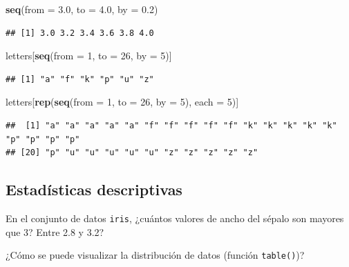 \documentclass[
]{book}
\newenvironment{Shaded}{\begin{snugshade}}{\end{snugshade}}
\newcommand{\DataTypeTok}[1]{\textcolor[rgb]{0.13,0.29,0.53}{#1}}
\newcommand{\DecValTok}[1]{\textcolor[rgb]{0.00,0.00,0.81}{#1}}
\newcommand{\FloatTok}[1]{\textcolor[rgb]{0.00,0.00,0.81}{#1}}
\newcommand{\KeywordTok}[1]{\textcolor[rgb]{0.13,0.29,0.53}{\textbf{#1}}}
\newcommand{\NormalTok}[1]{#1}
\begin{document}
\begin{Shaded}
\begin{Highlighting}[]
\KeywordTok{seq}\NormalTok{(}\DataTypeTok{from =} \FloatTok{3.0}\NormalTok{, }\DataTypeTok{to =} \FloatTok{4.0}\NormalTok{, }\DataTypeTok{by =} \FloatTok{0.2}\NormalTok{)}
\end{Highlighting}
\end{Shaded}

\begin{verbatim}
## [1] 3.0 3.2 3.4 3.6 3.8 4.0
\end{verbatim}

\begin{Shaded}
\begin{Highlighting}[]
\NormalTok{letters[}\KeywordTok{seq}\NormalTok{(}\DataTypeTok{from =} \DecValTok{1}\NormalTok{, }\DataTypeTok{to =} \DecValTok{26}\NormalTok{, }\DataTypeTok{by =} \DecValTok{5}\NormalTok{)]}
\end{Highlighting}
\end{Shaded}

\begin{verbatim}
## [1] "a" "f" "k" "p" "u" "z"
\end{verbatim}

\begin{Shaded}
\begin{Highlighting}[]
\NormalTok{letters[}\KeywordTok{rep}\NormalTok{(}\KeywordTok{seq}\NormalTok{(}\DataTypeTok{from =} \DecValTok{1}\NormalTok{, }\DataTypeTok{to =} \DecValTok{26}\NormalTok{, }\DataTypeTok{by =} \DecValTok{5}\NormalTok{), }\DataTypeTok{each =} \DecValTok{5}\NormalTok{)]}
\end{Highlighting}
\end{Shaded}

\begin{verbatim}
##  [1] "a" "a" "a" "a" "a" "f" "f" "f" "f" "f" "k" "k" "k" "k" "k" "p" "p" "p" "p"
## [20] "p" "u" "u" "u" "u" "u" "z" "z" "z" "z" "z"
\end{verbatim}

\hypertarget{estaduxedsticas-descriptivas-1}{%
\subsection{Estadísticas descriptivas}\label{estaduxedsticas-descriptivas-1}}

En el conjunto de datos \texttt{iris}, ¿cuántos valores de ancho del sépalo son mayores que 3? Entre 2.8 y 3.2?

¿Cómo se puede visualizar la distribución de datos (función \texttt{table()})?
\end{document}
